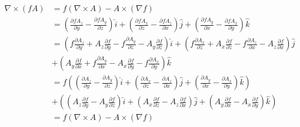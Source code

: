 \documentclass[12pt]{article}
\begin{document}
\vspace{0.5cm}


\begin{align*}
\nabla\times(fA) &= f(\nabla\times A) - A\times(\nabla f) \\
&= \left(\frac{\partial fA_z}{\partial y} - \frac{\partial fA_y}{\partial z}\right)\hat{i} + \left(\frac{\partial fA_x}{\partial z} - \frac{\partial fA_z}{\partial x}\right)\hat{j} + \left(\frac{\partial fA_y}{\partial x} - \frac{\partial fA_x}{\partial y}\right)\hat{k} \\
&= \left(f\frac{\partial A_z}{\partial y} + A_z\frac{\partial f}{\partial y} - f\frac{\partial A_y}{\partial z} - A_y\frac{\partial f}{\partial z}\right)\hat{i} + \left(f\frac{\partial A_x}{\partial z} + A_x\frac{\partial f}{\partial z} - f\frac{\partial A_z}{\partial x} - A_z\frac{\partial f}{\partial x}\right)\hat{j} \\
&+ \left(A_y\frac{\partial f}{\partial x} + f\frac{\partial A_y}{\partial x} - A_x\frac{\partial f}{\partial y} - f\frac{\partial A_x}{\partial y}\right)\hat{k} \\
&= f\left(\left(\frac{\partial A_z}{\partial y} - \frac{\partial A_y}{\partial z}\right)\hat{i} + \left(\frac{\partial A_x}{\partial z} - \frac{\partial A_z}{\partial x}\right)\hat{j} + \left(\frac{\partial A_y}{\partial x} - \frac{\partial A_x}{\partial y}\right)\hat{k}\right) \\
&+ \left(\left(A_z\frac{\partial f}{\partial y} - A_y\frac{\partial f}{\partial z}\right)\hat{i} + \left(A_x\frac{\partial f}{\partial z} - A_z\frac{\partial f}{\partial x}\right)\hat{j} + \left(A_y\frac{\partial f}{\partial x} - A_x\frac{\partial f}{\partial y}\right)\hat{k}\right) \\
&= f(\nabla\times A) - A\times(\nabla f)
\end{align*}
\end{document}
